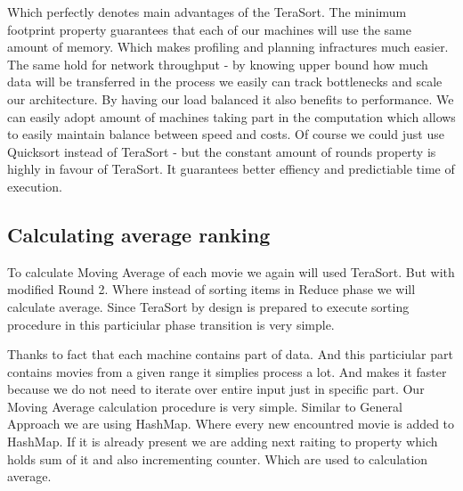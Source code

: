 Which perfectly denotes main advantages of the TeraSort. The minimum footprint property guarantees
that each of our machines will use the same amount of memory. Which makes profiling
and planning infractures much easier. The same hold for network throughput - by knowing
upper bound how much data will be transferred in the process we easily can track bottlenecks
and scale our architecture.
By having our load balanced it also benefits to performance. We can easily adopt amount of machines
taking part in the computation which allows to easily maintain balance between speed and costs.
Of course we could just use Quicksort instead of TeraSort - but the constant amount of rounds property
is highly in favour of TeraSort. It guarantees better effiency and predictiable time of execution.


\subsection{Calculating average ranking}
To calculate Moving Average of each movie we again will used TeraSort. 
But with modified Round 2. Where instead of sorting items in Reduce phase
we will calculate average. Since TeraSort by design is prepared to execute 
sorting procedure in this particiular phase transition is very simple.

Thanks to fact that each machine contains part of data. And this particiular part contains movies from
a given range it simplies process a lot. And makes it faster because we do not need to iterate over entire 
input just in specific part.
Our Moving Average calculation procedure is very simple. Similar to General Approach
we are using HashMap. Where every new encountred movie is added to HashMap. If it is already 
present we are adding next raiting to property which holds sum of it and also incrementing counter.
Which are used to calculation average.







